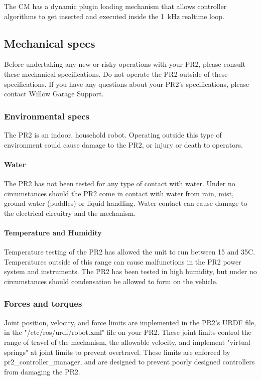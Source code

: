 The CM has a dynamic plugin loading mechanism that allows controller
algorithms to get inserted and executed inside the 1~kHz realtime
loop.


\subsection{Mechanical specs}

Before undertaking any new or risky operations with your PR2, please consult these mechanical specifications. Do not operate the PR2 outside of these specifications. If you have any questions about your PR2's specifications, please contact Willow Garage Support.

\subsubsection{Environmental specs}

The PR2 is an indoor, household robot. Operating outside this type of environment could cause damage to the PR2, or injury or death to operators.

\paragraph{Water}

The PR2 has not been tested for any type of contact with water. Under no circumstances should the PR2 come in contact with water from rain, mist, ground water (puddles) or liquid handling. Water contact can cause damage to the electrical circuitry and the mechanism.

\paragraph{Temperature and Humidity}

Temperature testing of the PR2 has allowed the unit to run between 15 and 35C. Temperatures outside of this range can cause malfunctions in the PR2 power system and instruments. The PR2 has been tested in high humidity, but under no circumstances should condensation be allowed to form on the vehicle.

\subsubsection{Forces and torques}

Joint position, velocity, and force limits are implemented in the PR2's URDF file, in the "/etc/ros/urdf/robot.xml" file on your PR2. These joint limits control the range of travel of the mechanism, the allowable velocity, and implement "virtual springs" at joint limits to prevent overtravel. These limits are enforced by pr2\_controller\_manager, and are designed to prevent poorly designed controllers from damaging the PR2.

